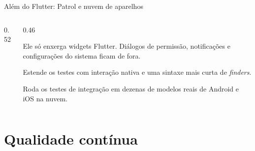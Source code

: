 \documentclass[aspectratio=169,10pt]{beamer}
\begin{document}
\begin{frame}[fragile]{Além do Flutter: Patrol e nuvem de aparelhos}
  \begin{columns}[T]
    \begin{column}{0.52\textwidth}
    \end{column}
    \begin{column}{0.46\textwidth}
      \begin{conceito}
        Ele só enxerga widgets Flutter. Diálogos de permissão, notificações e configurações do sistema ficam de fora.
      \end{conceito}
      \begin{dica}[Patrol]
        Estende os testes com interação nativa e uma sintaxe mais curta de \emph{finders}.
      \end{dica}
      \begin{dica}
        Roda os testes de integração em dezenas de modelos reais de Android e iOS na nuvem.
      \end{dica}
    \end{column}
  \end{columns}
\end{frame}

\section{Qualidade contínua}
\end{document}
